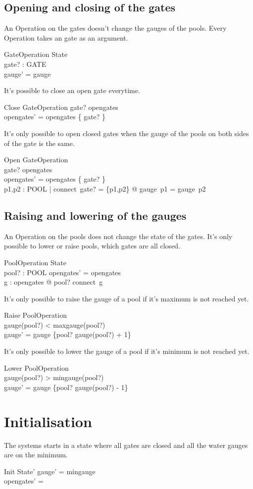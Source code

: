 \documentclass[a4paper]{article}
\begin{document}
\subsection{Opening and closing of the gates}
An Operation on the gates doesn't change the gauges of the pools. Every
Operation takes an gate as an argument.
\begin{schema}{GateOperation}
  \Delta State\\
  gate? : GATE\\
  \where
  gauge' = gauge
\end{schema}
It's possible to close an open gate everytime.
\begin{schema}{Close}
  GateOperation
  \where
  gate? \in opengates\\
  opengates' = opengates \setminus \{ gate? \}
\end{schema}
It's only possible to open closed gates when the gauge of the pools
on both sides of the gate is the same.
\begin{schema}{Open}
  GateOperation\\
  \where
  gate? \notin opengates\\
  opengates' = opengates \cup \{ gate? \}\\
  \forall p1,p2 : POOL | connect~gate? = \{p1,p2\} @ gauge~p1 = gauge~p2
\end{schema}

\subsection{Raising and lowering of the gauges}
An Operation on the pools does not change the state of the gates.
It's only possible to lower or raise pools, which gates are all
closed.
\begin{schema}{PoolOperation}
  \Delta State\\
  pool? : POOL
  \where
  opengates' = opengates\\
  \forall g : opengates @ pool? \notin connect~g\\
\end{schema}
It's only possible to raise the gauge of a pool if it's maximum is
not reached yet.
\begin{schema}{Raise}
  PoolOperation\\
  \where
  gauge(pool?) < maxgauge(pool?)\\
  gauge' = gauge \oplus \{pool? \mapsto gauge(pool?) + 1\}\\
\end{schema}
It's only possible to lower the gauge of a pool if it's minimum is
not reached yet.
\begin{schema}{Lower}
  PoolOperation\\
  \where
  gauge(pool?) > mingauge(pool?)\\
  gauge' = gauge \oplus \{pool? \mapsto gauge(pool?) - 1\}\\
\end{schema}
  

\section{Initialisation}
The systems starts in a state where all gates are closed and
all the water gauges are on the minimum.
\begin{schema}{Init}
  State'
  \where
  gauge' = mingauge\\
  opengates' = \emptyset\\
\end{schema}
\end{document}
